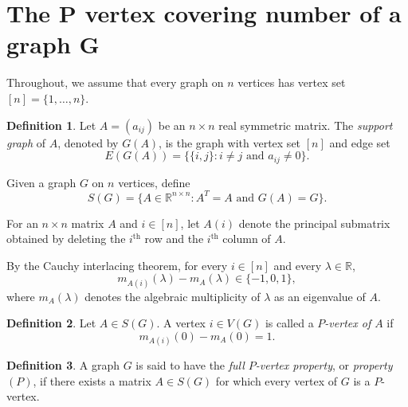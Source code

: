 \documentclass[12pt,reqno]{amsart}
\theoremstyle{plain}
\theoremstyle{definition}
\newtheorem{defn}{Definition}
\newtheorem{rem}{Remark}
\theoremstyle{block}
\theoremstyle{remark}
\numberwithin{equation}{section}
\begin{document}
\section{The P vertex covering number of a graph G}

Throughout, we assume that every graph on \(n\) vertices has vertex set
\([n]=\{1,\ldots,n\}\).

\begin{defn}
Let \(A=(a_{ij})\) be an \(n\times n\) real symmetric matrix. The
\emph{support graph} of \(A\), denoted by \(G(A)\), is the graph with
vertex set \([n]\) and edge set
\[
E(G(A))
=
\bigl\{\{i,j\}: i\neq j \text{ and } a_{ij}\neq 0\bigr\}.
\]
\end{defn}

Given a graph \(G\) on \(n\) vertices, define
\[
S(G)
=
\bigl\{A\in\mathbb{R}^{n\times n}: A^{T}=A
\text{ and } G(A)=G\bigr\}.
\]

For an \(n\times n\) matrix \(A\) and \(i\in[n]\), let \(A(i)\) denote
the principal submatrix obtained by deleting the \(i^\text{th}\) row and the
\(i^\text{th}\) column of \(A\).

By the Cauchy interlacing theorem, for every \(i\in[n]\) and every
\(\lambda\in\mathbb{R}\),
\[
m_{A(i)}(\lambda)-m_A(\lambda)\in\{-1,0,1\},
\]
where \(m_A(\lambda)\) denotes the algebraic multiplicity of \(\lambda\)
as an eigenvalue of \(A\).

\begin{defn}
Let \(A\in S(G)\). A vertex \(i\in V(G)\) is called a
\emph{\(P\)-vertex of \(A\)} if
\[
m_{A(i)}(0)-m_A(0)=1.
\]
\end{defn}

\begin{defn}
A graph \(G\) is said to have the \emph{full \(P\)-vertex property}, or
\emph{property \((P)\)}, if there exists a matrix \(A\in S(G)\) for
which every vertex of \(G\) is a \(P\)-vertex.
\end{defn}

\end{document}
